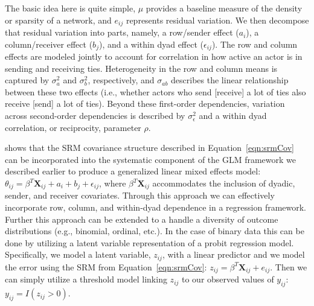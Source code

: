 The basic idea here is quite simple, $\mu$ provides a baseline measure of the density or sparsity of a network, and $e_{ij}$ represents residual variation. We then decompose that residual variation into parts, namely, a row/sender effect ($a_{i}$), a column/receiver effect ($b_{j}$), and a within dyad effect ($\epsilon_{ij}$). The row and column effects are modeled jointly to account for correlation in how active an actor is in sending and receiving ties. Heterogeneity in the row and column means is captured by $\sigma_{a}^{2}$ and $\sigma_{b}^{2}$, respectively, and $\sigma_{ab}$ describes the linear relationship between these two effects (i.e., whether actors who send [receive] a lot of ties also receive [send] a lot of ties). Beyond these first-order dependencies, variation across second-order dependencies is described by $\sigma_{\epsilon}^{2}$ and a within dyad correlation, or reciprocity, parameter $\rho$. 

\citet{hoff:2005} shows that the SRM covariance structure described in Equation~\ref{eqn:srmCov} can be incorporated into the systematic component of the GLM framework we described earlier to produce a generalized linear mixed effects model: $\theta_{ij} = \beta^{T} \mathbf{X}_{ij} + a_{i} + b_{j} + \epsilon_{ij}$, where $ \beta^{T} \mathbf{X}_{ij}$ accommodates the inclusion of dyadic, sender, and receiver covariates. Through this approach we can effectively incorporate row, column, and within-dyad dependence in a regression framework. Further this approach can be extended to a handle a diversity of outcome distributions (e.g., binomial, ordinal, etc.). In the case of binary data this can be done by utilizing a latent variable representation of a probit regression model. Specifically, we model a latent variable, $z_{ij}$, with a linear predictor and we model the error using the SRM from Equation~\ref{eqn:srmCov}: $z_{ij} = \beta^{T} \mathbf{X}_{ij} + e_{ij}$. Then we can simply utilize a threshold model linking $z_{ij}$ to our observed values of $y_{ij}$: $y_{ij} = I(z_{ij}>0)$. 



